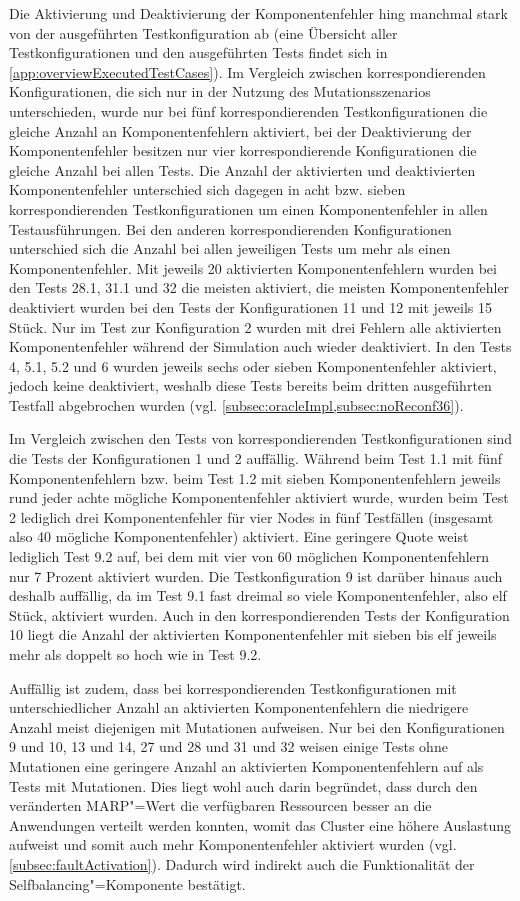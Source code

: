 Die Aktivierung und Deaktivierung der Komponentenfehler hing manchmal stark von der ausgeführten Testkonfiguration ab (eine Übersicht aller Testkonfigurationen und den ausgeführten Tests findet sich in \cref{app:overviewExecutedTestCases}).
Im Vergleich zwischen korrespondierenden Konfigurationen, die sich nur in der Nutzung des Mutationsszenarios unterschieden, wurde nur bei fünf korrespondierenden Testkonfigurationen die gleiche Anzahl an Komponentenfehlern aktiviert, bei der Deaktivierung der Komponentenfehler besitzen nur vier korrespondierende Konfigurationen die gleiche Anzahl bei allen Tests.
Die Anzahl der aktivierten und deaktivierten Komponentenfehler unterschied sich dagegen in acht bzw. sieben korrespondierenden Testkonfigurationen um einen Komponentenfehler in allen Testausführungen.
Bei den anderen korrespondierenden Konfigurationen unterschied sich die Anzahl bei allen jeweiligen Tests um mehr als einen Komponentenfehler.
Mit jeweils 20 aktivierten Komponentenfehlern wurden bei den Tests 28.1, 31.1 und 32 die meisten aktiviert, die meisten Komponentenfehler deaktiviert wurden bei den Tests der Konfigurationen 11 und 12 mit jeweils 15 Stück.
Nur im Test zur Konfiguration 2 wurden mit drei Fehlern alle aktivierten Komponentenfehler während der Simulation auch wieder deaktiviert.
In den Tests 4, 5.1, 5.2 und 6 wurden jeweils sechs oder sieben Komponentenfehler aktiviert, jedoch keine deaktiviert, weshalb diese Tests bereits beim dritten ausgeführten Testfall abgebrochen wurden (vgl. \cref{subsec:oracleImpl,subsec:noReconf36}).

Im Vergleich zwischen den Tests von korrespondierenden Testkonfigurationen sind die Tests der Konfigurationen 1 und 2 auffällig.
Während beim Test 1.1 mit fünf Komponentenfehlern bzw. beim Test 1.2 mit sieben Komponentenfehlern jeweils rund jeder achte mögliche Komponentenfehler aktiviert wurde, wurden beim Test 2 lediglich drei Komponentenfehler für vier Nodes in fünf Testfällen (insgesamt also 40 mögliche Komponentenfehler) aktiviert.
Eine geringere Quote weist lediglich Test 9.2 auf, bei dem mit vier von 60 möglichen Komponentenfehlern nur 7 Prozent aktiviert wurden.
Die Testkonfiguration 9 ist darüber hinaus auch deshalb auffällig, da im Test 9.1 fast dreimal so viele Komponentenfehler, also elf Stück, aktiviert wurden.
Auch in den korrespondierenden Tests der Konfiguration 10 liegt die Anzahl der aktivierten Komponentenfehler mit sieben bis elf jeweils mehr als doppelt so hoch wie in Test 9.2.

Auffällig ist zudem, dass bei korrespondierenden Testkonfigurationen mit unterschiedlicher Anzahl an aktivierten Komponentenfehlern die niedrigere Anzahl meist diejenigen mit Mutationen aufweisen.
Nur bei den Konfigurationen 9 und 10, 13 und 14, 27 und 28 und 31 und 32 weisen einige Tests ohne Mutationen eine geringere Anzahl an aktivierten Komponentenfehlern auf als Tests mit Mutationen.
Dies liegt wohl auch darin begründet, dass durch den veränderten \gls{MARP}"=Wert die verfügbaren Ressourcen besser an die Anwendungen verteilt werden konnten, womit das Cluster eine höhere Auslastung aufweist und somit auch mehr Komponentenfehler aktiviert wurden (vgl. \cref{subsec:faultActivation}).
Dadurch wird indirekt auch die Funktionalität der Selfbalancing"=Komponente \cite{Zhang2016} bestätigt.

